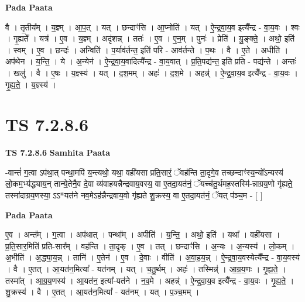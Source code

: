 \documentclass[17pt]{extarticle}
\begin{document}
\textbf{Pada Paata} \newline

वै । तृ॒तीय᳚म् । य॒ज्ञ्म् । आ॒प॒त् । यत् । छन्दाꣳ॑सि । आ॒प्नोति॑ । यत् । ऐ॒न्द्र॒वा॒य॒व इत्यै᳚न्द्र - वा॒य॒वः । श्वः । गृ॒ह्यते᳚ । यत्र॑ । ए॒व । य॒ज्ञ्म् । अदृ॑शन्न् । ततः॑ । ए॒व । ए॒न॒म् । पुनः॑ । प्रेति॑ । यु॒ङ्क्ते॒ । अथो॒ इति॑ । स्वम् । ए॒व । छन्दः॑ । अन्विति॑ । प॒र्याव॑र्तन्त॒ इति॑ परि - आव॑र्तन्ते । प॒थः । वै । ए॒ते । अधीति॑ । अप॑थेन । य॒न्ति॒ । ये । अ॒न्येन॑ । ऐ॒न्द्र॒वा॒य॒वादित्यै᳚न्द्र - वा॒य॒वात् । प्र॒ति॒पद्य॑न्त॒ इति॑ प्रति - पद्य॑न्ते । अन्तः॑ । खलु॑ । वै । ए॒षः । य॒ज्ञ्स्य॑ । यत् । द॒श॒मम् । अहः॑ । द॒श॒मे । अहन्न्॑ । ऐ॒न्द्र॒वा॒य॒व इत्यै᳚न्द्र - वा॒य॒वः । गृ॒ह्य॒ते॒ । य॒ज्ञ्स्य॑ ।  \newline




\section*{ TS 7.2.8.6 }

\textbf{TS 7.2.8.6 } \newline
\textbf{Samhita Paata} \newline

-वान्तं॑ ग॒त्वा ऽप॑था॒त् पन्था॒मपि॑ य॒न्त्यथो॒ यथा॒ वही॑यसा प्रति॒सारं॒ ॅवह॑न्ति ता॒दृगे॒व तच्छन्दाꣳ॑स्य॒न्यो᳚ऽन्यस्य॑ लो॒कम॒भ्य॑द्ध्याय॒न् तान्ये॒तेनै॒व दे॒वा व्य॑वाहयन्नैन्द्रवाय॒वस्य॒ वा ए॒तदा॒यत॑नं॒ ॅयच्च॑तु॒र्थमह॒स्तस्मि॑-न्नाग्रय॒णो गृ॑ह्यते॒ तस्मा॑दाग्रय॒णस्या॒ ऽऽ*यत॑ने नव॒मेऽह॑न्नैन्द्रवाय॒वो गृ॑ह्यते शु॒क्रस्य॒ वा ए॒तदा॒यत॑नं॒ ॅयत् प॑ञ्च॒म - [  ] \newline

\textbf{Pada Paata} \newline

ए॒व । अन्त᳚म् । ग॒त्वा । अप॑थात् । पन्था᳚म् । अपीति॑ । य॒न्ति॒ । अथो॒ इति॑ । यथा᳚ । वही॑यसा । प्र॒ति॒सार॒मिति॑ प्रति-सार᳚म् । वह॑न्ति । ता॒दृक् । ए॒व । तत् । छन्दाꣳ॑सि । अ॒न्यः । अ॒न्यस्य॑ । लो॒कम् । अ॒भीति॑ । अ॒द्ध्या॒य॒न्न् । तानि॑ । ए॒तेन॑ । ए॒व । दे॒वाः । वीति॑ । अ॒वा॒ह॒य॒न्न् । ऐ॒न्द्र॒वा॒य॒वस्येत्यै᳚न्द्र - वा॒य॒वस्य॑ । वै । ए॒तत् । आ॒यत॑न॒मित्या᳚ - यत॑नम् । यत् । च॒तु॒र्थम् । अहः॑ । तस्मिन्न्॑ । आ॒ग्र॒य॒णः । गृ॒ह्य॒ते॒ । तस्मा᳚त् । आ॒ग्र॒य॒णस्य॑ । आ॒यत॑न॒ इत्या᳚-यत॑ने । न॒व॒मे । अहन्न्॑ । ऐ॒न्द्र॒वा॒य॒व इत्यै᳚न्द्र - वा॒य॒वः । गृ॒ह्य॒ते॒ । शु॒क्रस्य॑ । वै । ए॒तत् । आ॒यत॑न॒मित्या᳚ - यत॑नम् । यत् । प॒ञ्च॒मम् ।  \newline
\end{document}
